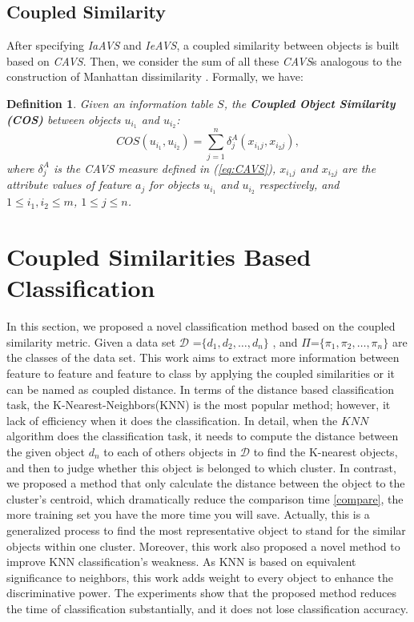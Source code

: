 \documentclass{article}
\newtheorem{Def}{Definition}[section]
\numberwithin{equation}{section}
\begin{document}
\subsection{Coupled Similarity}

After specifying \emph{IaAVS} and \emph{IeAVS}, a coupled similarity between objects is built based on \emph{CAVS}. Then, we consider the sum of all these \emph{CAVS}s analogous to the construction of Manhattan dissimilarity \cite{Gan:2007}. Formally, we have:
\begin{Def}
\label{def:COS}
Given an information table $S$, the \textbf{Coupled Object Similarity (COS)} between objects $u_{i_1}$ and $u_{i_2}$:
\begin{equation}
COS(u_{i_1},u_{i_2})=\sum_{j=1}^n\delta^A_j(x_{i_1j},x_{i_2j}),
\label{eq:COS}
\end{equation}
where $\delta^A_j$ is the \emph{CAVS} measure defined in (\ref{eq:CAVS}), $x_{i_1j}$ and $x_{i_2j}$ are the attribute values of feature $a_j$ for objects $u_{i_1}$ and $u_{i_2}$ respectively, and $1\le i_1,i_2\le m$, $1\le j\le n$.
\end{Def}


\section{Coupled Similarities Based Classification}

In this section, we proposed a novel classification method based on the coupled similarity metric.
Given a data set $\mathcal{D}$ =$\{d_{1},d_{2},\ldots,d_{n}\}$ , and $\Pi$=$\{\pi_{1},\pi_{2},\ldots,\pi_{n}\}$ are the
classes of the data set. This work aims to extract more information between feature to feature and feature to class by applying the coupled similarities or it can be named as coupled distance. In terms of the distance based classification task, the K-Nearest-Neighbors(KNN) is the most popular method; however, it lack of efficiency when it does the classification. In detail, when the $KNN$ algorithm does the classification task, it needs to compute the distance between the given object $d_{n}$ to each of others objects in $\mathcal{D}$  to find the K-nearest objects, and then to judge whether this object is belonged to which cluster. In contrast, we proposed a method that only calculate the distance between the object to the cluster's centroid, which dramatically reduce the comparison time \ref{compare}, the more training set you have the more time you will save.  Actually, this is a generalized process to find the most representative object to stand for the similar objects within one cluster. Moreover, this work also proposed a novel method to improve  KNN classification's weakness. As KNN is based on equivalent significance to neighbors, this work adds weight to every object to enhance the discriminative power. The experiments show that the proposed method reduces the time of classification substantially, and it does not lose classification accuracy.
\end{document}
